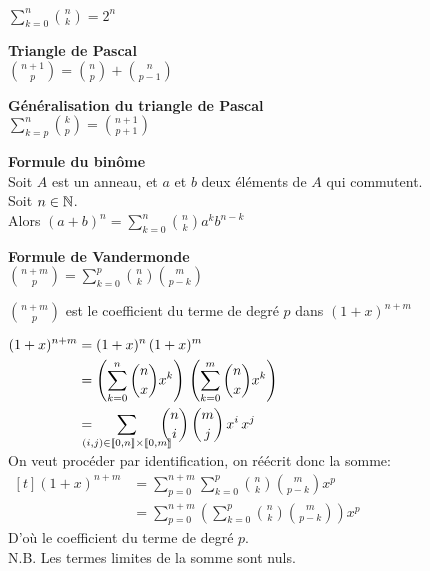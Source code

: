 \documentclass[12pt,twoside,a4paper]{article}
\author{MPSI 2}
\begin{document}
	\maketitle
	\begin{prop}
		$\sum\limits_{k=0}^{n}\binom{n}{k}=2^{n}$
	\end{prop}
	\begin{prop}
		\textbf{Triangle de Pascal}\\
		$\binom{n+1}{p}=\binom{n}{p}+\binom{n}{p-1}$
	\end{prop}
	\begin{prop}
		\textbf{Généralisation du triangle de Pascal}\\
		$\sum\limits_{k=p}^{n}\binom{k}{p}=\binom{n+1}{p+1}$
	\end{prop}
	\begin{prop}
		\textbf{Formule du bin\^ome}\\
		Soit $A$ est un anneau, et $a$ et $b$ deux éléments de $A$ qui commutent.\\
		Soit $n\in\mathbb{N}$.\\
		Alors $(a+b)^{n}=\sum\limits^{n}_{k=0}\binom{n}{k}a^{k}b^{n-k}$
	\end{prop}
\newpage
	\begin{prop}
		\textbf{Formule de Vandermonde}\\
		$\binom{n+m}{p}=\sum\limits^{p}_{k=0}\binom{n}{k}\binom{m}{p-k}$
	\end{prop}
	\begin{preuve}
		\begin{liste}
			\item $\binom{n+m}{p}$ est le coefficient du terme de degré $p$ dans $(1+x)^{n+m}$
			\item $\begin{aligned}[t]
				(1+x)^{n+m} & = (1+x)^{n}\,(1+x)^{m}\\
				& = \left(\sum\limits_{k=0}^{n}\binom{n}{x}x^{k} \right)\,\left(\sum\limits_{k=0}^{m}\binom{n}{x}x^{k} \right)\\
				& = \!\!\!\!\!\!\sum\limits_{(i,j)\in \lbracket 0,n\rbracket\times \lbracket 0,m\rbracket}\!\!\!\!\!\! \binom{n}{i}\,\binom{m}{j}\,x^{i}\,x^{j}
			\end{aligned}$\\
			On veut procéder par identification, on réécrit donc la somme:\\
			$\begin{aligned}[t]
				(1+x)^{n+m} & =\sum\limits_{p=0}^{n+m}\sum\limits^{p}_{k=0}\binom{n}{k}\binom{m}{p-k} x^{p}\\
				& = \sum\limits_{p=0}^{n+m} \left( \sum\limits^{p}_{k=0}\binom{n}{k}\binom{m}{p-k}\right)  x^{p}
			\end{aligned}$\\
			D'o\`u le coefficient du terme de degré $p$.\\
			N.B. Les termes limites de la somme sont nuls.
		\end{liste}
	\end{preuve}
\end{document}
